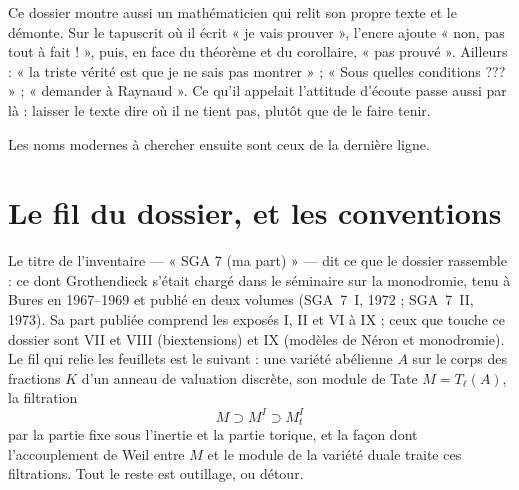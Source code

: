 \documentclass[11pt,a4paper]{article}
\begin{document}
\begin{resume}
Ce dossier montre aussi un mathématicien qui relit son propre texte et le
démonte. Sur le tapuscrit où il écrit « je vais prouver », l'encre ajoute
« non, pas tout à fait ! », puis, en face du théorème et du corollaire, « pas
prouvé ». Ailleurs : « la triste vérité est que je ne sais pas montrer » ; « Sous
quelles conditions ??? » ; « demander à Raynaud ». Ce qu'il appelait l'attitude
d'écoute passe aussi par là : laisser le texte dire où il ne tient pas, plutôt
que de le faire tenir.

Les noms modernes à chercher ensuite sont ceux de la dernière ligne.

\end{resume}

\section*{Le fil du dossier, et les conventions}

Le titre de l'inventaire --- « SGA 7 (ma part) » --- dit ce que le dossier
rassemble : ce dont Grothendieck s'était chargé dans le séminaire sur la
monodromie, tenu à Bures en 1967--1969 et publié en deux volumes (SGA~7~I, 1972 ;
SGA~7~II, 1973). Sa part publiée comprend les exposés I, II et VI à IX ; ceux que
touche ce dossier sont VII et VIII (biextensions) et IX (modèles de Néron et
monodromie). Le fil qui relie les feuillets est le
suivant : une variété abélienne $A$ sur le corps des fractions $K$ d'un anneau de
valuation discrète, son module de Tate $M = T_\ell(A)$, la filtration
\[ M \supset M^{I} \supset M^{I}_{t} \]
par la partie fixe sous l'inertie et la partie torique, et la façon dont
l'accouplement de Weil entre $M$ et le module de la variété duale traite ces
filtrations. Tout le reste est outillage, ou détour.
\end{document}
